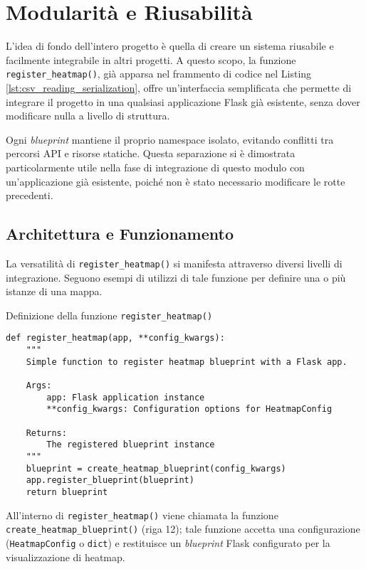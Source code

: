 \section{Modularità e Riusabilità}

L'idea di fondo dell'intero progetto è quella di creare un sistema riusabile e facilmente integrabile in altri progetti. A questo scopo, la funzione \texttt{register\_heatmap()}, già apparsa nel frammento di codice nel Listing \ref{lst:csv_reading_serialization}, offre un'interfaccia semplificata che permette di integrare il progetto in una qualsiasi applicazione Flask già esistente, senza dover modificare nulla a livello di struttura.

Ogni \textit{blueprint} mantiene il proprio namespace isolato, evitando conflitti tra percorsi API e risorse statiche. Questa separazione si è dimostrata particolarmente utile nella fase di integrazione di questo modulo con un'applicazione già esistente, poiché non è stato necessario modificare le rotte precedenti.

\subsection{Architettura e Funzionamento}

La versatilità di \texttt{register\_heatmap()} si manifesta attraverso diversi livelli di integrazione.
Seguono esempi di utilizzi di tale funzione per definire una o più istanze di una mappa.

\begin{listing}[H]
\caption{Definizione della funzione \texttt{register\_heatmap()}}
\label{lst:register_heatmap_def}
\begin{verbatim}
def register_heatmap(app, **config_kwargs):
    """
    Simple function to register heatmap blueprint with a Flask app.
    
    Args:
        app: Flask application instance
        **config_kwargs: Configuration options for HeatmapConfig
    
    Returns:
        The registered blueprint instance
    """
    blueprint = create_heatmap_blueprint(config_kwargs)
    app.register_blueprint(blueprint)
    return blueprint
\end{verbatim}
\end{listing}

All'interno di \texttt{register\_heatmap()} viene chiamata la funzione \texttt{create\_heatmap\_blueprint()} (riga 12); tale funzione accetta una configurazione (\texttt{HeatmapConfig} o \texttt{dict}) e restituisce un \textit{blueprint} Flask configurato per la visualizzazione di heatmap.

